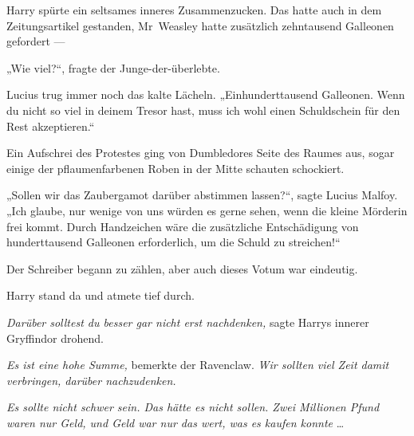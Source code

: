 Harry spürte ein seltsames inneres Zusammenzucken. Das hatte auch in dem Zeitungsartikel gestanden, Mr~Weasley hatte zusätzlich zehntausend Galleonen gefordert —

„Wie viel?“, fragte der Junge-der-überlebte.

Lucius trug immer noch das kalte Lächeln.
„Einhunderttausend Galleonen. Wenn du nicht so viel in deinem Tresor hast, muss ich wohl einen Schuldschein für den Rest akzeptieren.“

Ein Aufschrei des Protestes ging von Dumbledores Seite des Raumes aus, sogar einige der pflaumenfarbenen Roben in der Mitte schauten schockiert.

„Sollen wir das Zaubergamot darüber abstimmen lassen?“, sagte Lucius Malfoy.
„Ich glaube, nur wenige von uns würden es gerne sehen, wenn die kleine Mörderin frei kommt. Durch Handzeichen wäre die zusätzliche Entschädigung von hunderttausend Galleonen erforderlich, um die Schuld zu streichen!“

Der Schreiber begann zu zählen, aber auch dieses Votum war eindeutig.

Harry stand da und atmete tief durch.

\emph{Darüber solltest du besser gar nicht erst nachdenken,} sagte Harrys innerer Gryffindor drohend.

\emph{Es ist eine hohe Summe,} bemerkte der Ravenclaw. \emph{Wir sollten viel Zeit damit verbringen, darüber nachzudenken.}

\emph{Es sollte nicht schwer sein. Das hätte es nicht sollen. Zwei Millionen Pfund waren nur Geld, und Geld war nur das wert, was es kaufen konnte} …

